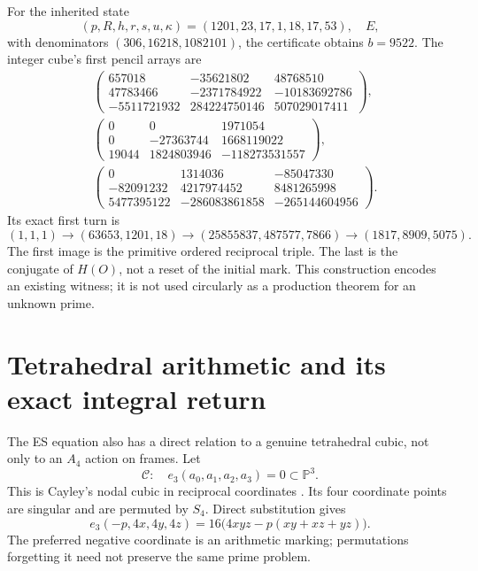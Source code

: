 \documentclass[11pt,reqno]{amsart}
\theoremstyle{definition}\newtheorem{definition}[theorem]{Definition}
\theoremstyle{remark}\newtheorem{remark}[theorem]{Remark}
\begin{document}
For the inherited state
\[
 (p,R,h,r,s,u,\kappa)=(1201,23,17,1,18,17,53),\quad E,
\]
with denominators $(306,16218,1082101)$, the certificate obtains $b=9522$.
The integer cube's first pencil arrays are
\begin{align*}
 &\begin{pmatrix}657018&-35621802&48768510\\
 47783466&-2371784922&-10183692786\\
 -5511721932&284224750146&507029017411\end{pmatrix},\\[1mm]
 &\begin{pmatrix}0&0&1971054\\0&-27363744&1668119022\\
 19044&1824803946&-118273531557\end{pmatrix},\\[1mm]
 &\begin{pmatrix}0&1314036&-85047330\\-82091232&4217974452&8481265998\\
 5477395122&-286083861858&-265144604956\end{pmatrix}.
\end{align*}
Its exact first turn is
\[
 (1,1,1)\to(63653,1201,18)\to(25855837,487577,7866)
 \to(1817,8909,5075).
\]
The first image is the primitive ordered reciprocal triple. The last is the
conjugate of $H(O)$, not a reset of the initial mark. This construction encodes
an existing witness; it is not used circularly as a production theorem for an
unknown prime.

\section{Tetrahedral arithmetic and its exact integral return}

The ES equation also has a direct relation to a genuine tetrahedral cubic,
not only to an $A_4$ action on frames. Let
\[
 \mathscr C:\quad e_3(a_0,a_1,a_2,a_3)=0\subset\mathbb P^3.
\]
This is Cayley's nodal cubic in reciprocal coordinates
\cite[\S1, p.~1]{HB}. Its four coordinate points are singular and are permuted
by $S_4$. Direct substitution gives
\begin{equation}\label{eq:cayleyes}
 e_3(-p,4x,4y,4z)=16\big(4xyz-p(xy+xz+yz)\big).
\end{equation}
The preferred negative coordinate is an arithmetic marking; permutations
forgetting it need not preserve the same prime problem.
\end{document}
